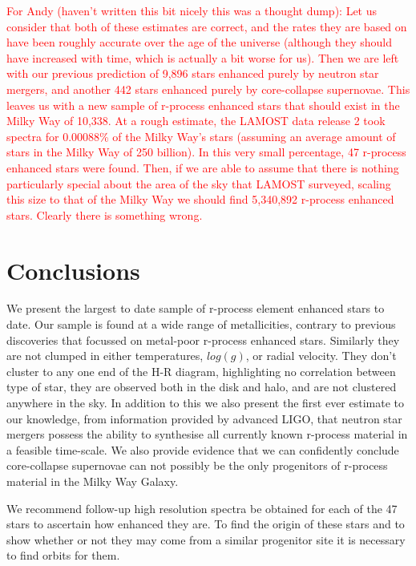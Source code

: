 \documentclass[a4paper,fleqn,usenatbib]{mnras}
\newcommand{\todo}[1]{\textcolor{red}{#1}}
\begin{document}
    \todo{For Andy (haven't written this bit nicely this was a thought dump): Let us consider that both of these estimates are correct, and the rates they are based on have been roughly accurate over the age of the universe (although they should have increased with time, which is actually a bit worse for us). Then we are left with our previous prediction of 9,896 stars enhanced purely by neutron star mergers, and another 442 stars enhanced purely by core-collapse supernovae. This leaves us with a new sample of r-process enhanced stars that should exist in the Milky Way of 10,338. 
    At a rough estimate, the LAMOST data release 2 took spectra for 0.00088\% of the Milky Way's stars (assuming an average amount of stars in the Milky Way of 250 billion). In this very small percentage, 47 r-process enhanced stars were found. Then, if we are able to assume that there is nothing particularly special about the area of the sky that LAMOST surveyed, scaling this size to that of the Milky Way we should find 5,340,892 r-process enhanced stars. Clearly there is something wrong.}
    
	
	\section{Conclusions}
	We present the largest to date sample of r-process element enhanced stars to date. Our sample is found at a wide range of metallicities, contrary to previous discoveries that focussed on metal-poor r-process enhanced stars. Similarly they are not clumped in either temperatures, $log(g)$, or radial velocity. They don't cluster to any one end of the H-R diagram, highlighting no correlation between type of star, they are observed both in the disk and halo, and are not clustered anywhere in the sky. In addition to this we also present the first ever estimate to our knowledge, from information provided by advanced LIGO, that neutron star mergers possess the ability to synthesise all currently known r-process material in a feasible time-scale. We also provide evidence that we can confidently conclude core-collapse supernovae can not possibly be the only progenitors of r-process material in the Milky Way Galaxy.
	
	We recommend follow-up high resolution spectra be obtained for each of the 47 stars to ascertain how enhanced they are. To find the origin of these stars and to show whether or not they may come from a similar progenitor site it is necessary to find orbits for them.
	
	
	
\end{document}
